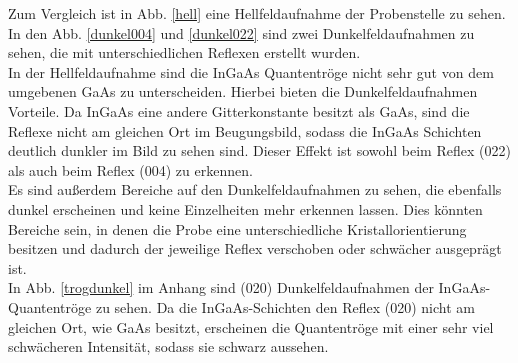 \documentclass[a4paper,11pt,DIV=11]{scrartcl}
\begin{document}
Zum Vergleich ist in Abb. \ref{hell} eine Hellfeldaufnahme der Probenstelle zu sehen. In den Abb. \ref{dunkel004} und \ref{dunkel022} sind zwei Dunkelfeldaufnahmen zu sehen, die mit unterschiedlichen Reflexen erstellt wurden. \\
In der Hellfeldaufnahme sind die InGaAs Quantentröge nicht sehr gut von dem umgebenen GaAs zu unterscheiden. Hierbei bieten die Dunkelfeldaufnahmen Vorteile. Da InGaAs eine andere Gitterkonstante besitzt als GaAs, sind die Reflexe nicht am gleichen Ort im Beugungsbild, sodass die InGaAs Schichten deutlich dunkler im Bild zu sehen sind. Dieser Effekt ist sowohl beim Reflex (022) als auch beim Reflex (004) zu erkennen. \\
Es sind außerdem Bereiche auf den Dunkelfeldaufnahmen zu sehen, die ebenfalls dunkel erscheinen und keine Einzelheiten mehr erkennen lassen. Dies könnten Bereiche sein, in denen die Probe eine unterschiedliche Kristallorientierung besitzen und dadurch der jeweilige Reflex verschoben oder schwächer ausgeprägt ist. \\
In Abb. \ref{trogdunkel} im Anhang sind (020) Dunkelfeldaufnahmen der InGaAs-Quantentröge zu sehen. Da die InGaAs-Schichten den Reflex (020) nicht am gleichen Ort, wie GaAs besitzt, erscheinen die Quantentröge mit einer sehr viel schwächeren Intensität, sodass sie schwarz aussehen.
\end{document}
